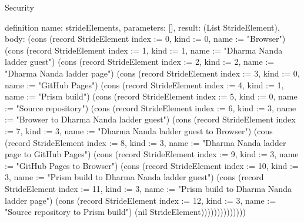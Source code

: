 \begin{lexlean}{Security}
\begin{semanticmodule}
definition{
  name: strideElements,
  parameters: [],
  result: (List StrideElement),
  body: (cons (record StrideElement {index := 0, kind := 0, name := "Browser"}) (cons (record StrideElement {index := 1, kind := 1, name := "Dharma Nanda ladder guest"}) (cons (record StrideElement {index := 2, kind := 2, name := "Dharma Nanda ladder page"}) (cons (record StrideElement {index := 3, kind := 0, name := "GitHub Pages"}) (cons (record StrideElement {index := 4, kind := 1, name := "Prism build"}) (cons (record StrideElement {index := 5, kind := 0, name := "Source repository"}) (cons (record StrideElement {index := 6, kind := 3, name := "Browser to Dharma Nanda ladder guest"}) (cons (record StrideElement {index := 7, kind := 3, name := "Dharma Nanda ladder guest to Browser"}) (cons (record StrideElement {index := 8, kind := 3, name := "Dharma Nanda ladder page to GitHub Pages"}) (cons (record StrideElement {index := 9, kind := 3, name := "GitHub Pages to Browser"}) (cons (record StrideElement {index := 10, kind := 3, name := "Prism build to Dharma Nanda ladder guest"}) (cons (record StrideElement {index := 11, kind := 3, name := "Prism build to Dharma Nanda ladder page"}) (cons (record StrideElement {index := 12, kind := 3, name := "Source repository to Prism build"}) (nil StrideElement))))))))))))))
}


\end{semanticmodule}
\end{lexlean}
